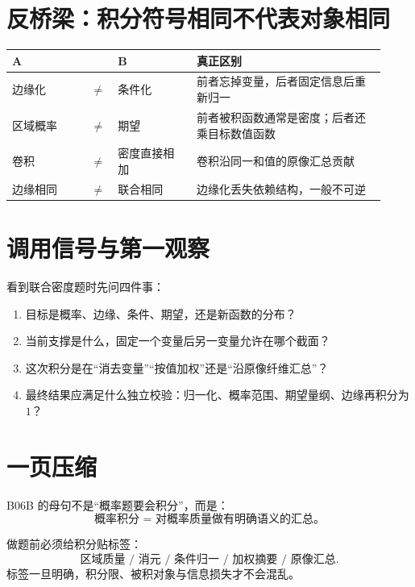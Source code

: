 \documentclass[profile=standard]{ipara-handbook}
\begin{document}
\section{反桥梁：积分符号相同不代表对象相同}
\begin{tabular}{p{0.20\linewidth}p{0.04\linewidth}p{0.20\linewidth}p{0.48\linewidth}}
\hline
A & & B & 真正区别\\
\hline
边缘化 & $\neq$ & 条件化 & 前者忘掉变量，后者固定信息后重新归一\\
区域概率 & $\neq$ & 期望 & 前者被积函数通常是密度；后者还乘目标数值函数\\
卷积 & $\neq$ & 密度直接相加 & 卷积沿同一和值的原像汇总贡献\\
边缘相同 & $\neq$ & 联合相同 & 边缘化丢失依赖结构，一般不可逆\\
\hline
\end{tabular}

\section{调用信号与第一观察}
看到联合密度题时先问四件事：
\begin{enumerate}
\item 目标是概率、边缘、条件、期望，还是新函数的分布？
\item 当前支撑是什么，固定一个变量后另一变量允许在哪个截面？
\item 这次积分是在“消去变量”“按值加权”还是“沿原像纤维汇总”？
\item 最终结果应满足什么独立校验：归一化、概率范围、期望量纲、边缘再积分为 $1$？
\end{enumerate}

\section{一页压缩}
B06B 的母句不是“概率题要会积分”，而是：
\[
\boxed{\text{概率积分 = 对概率质量做有明确语义的汇总。}}
\]

做题前必须给积分贴标签：
\[
\boxed{\text{区域质量 / 消元 / 条件归一 / 加权摘要 / 原像汇总}.}
\]
标签一旦明确，积分限、被积对象与信息损失才不会混乱。
\end{document}
